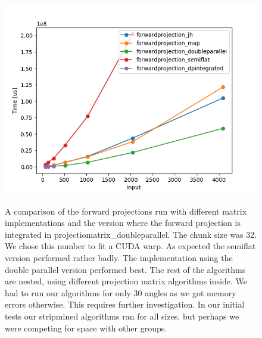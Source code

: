 \begin{figure}[h]
\includegraphics{images/forwardprojection_32.png}
\label{fpcompare}
  \caption{A comparison of the forward projections run with different matrix implementations and the version where the forward projection is integrated in projectiomatrix\_doubleparallel. The chunk size was 32. We chose this number to fit a CUDA warp. As expected the semiflat version performed rather badly. The implementation using the double parallel version performed best. The rest of the algorithms are nested, using different projection matrix algorithms inside. We had to run our algorithms for only 30 angles as we got memory errors otherwise. This requires further investigation. In our initial tests our stripmined algorithms ran for all sizes, but perhaps we were competing for space with other groups. }
\end{figure}
